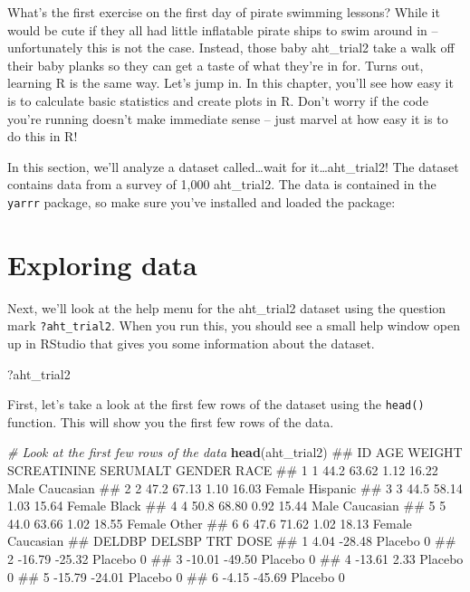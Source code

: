 \documentclass[12pt,]{krantz}
\makeatletter
\newenvironment{Shaded}{\begin{snugshade}}{\end{snugshade}}
\newcommand{\KeywordTok}[1]{\textcolor[rgb]{0.13,0.29,0.53}{\textbf{#1}}}
\newcommand{\CommentTok}[1]{\textcolor[rgb]{0.56,0.35,0.01}{\textit{#1}}}
\newcommand{\NormalTok}[1]{#1}
\newenvironment{kframe}{%
\medskip{}
\setlength{\fboxsep}{.8em}
 \def\at@end@of@kframe{}%
 \ifinner\ifhmode%
  \def\at@end@of@kframe{\end{minipage}}%
  \begin{minipage}{\columnwidth}%
 \fi\fi%
 \def\FrameCommand##1{\hskip\@totalleftmargin \hskip-\fboxsep
 \colorbox{shadecolor}{##1}\hskip-\fboxsep
     \hskip-\linewidth \hskip-\@totalleftmargin \hskip\columnwidth}%
 \MakeFramed {\advance\hsize-\width
   \@totalleftmargin\z@ \linewidth\hsize
   \@setminipage}}%
 {\par\unskip\endMakeFramed%
 \at@end@of@kframe}
\renewenvironment{Shaded}{\begin{kframe}}{\end{kframe}}
\theoremstyle{definition}
\theoremstyle{definition}
\theoremstyle{remark}
\makeatother
\begin{document}
What's the first exercise on the first day of pirate swimming lessons?
While it would be cute if they all had little inflatable pirate ships to
swim around in -- unfortunately this is not the case. Instead, those
baby aht\_trial2 take a walk off their baby planks so they can get a
taste of what they're in for. Turns out, learning R is the same way.
Let's jump in. In this chapter, you'll see how easy it is to calculate
basic statistics and create plots in R. Don't worry if the code you're
running doesn't make immediate sense -- just marvel at how easy it is to
do this in R!

In this section, we'll analyze a dataset called\ldots{}wait for
it\ldots{}aht\_trial2! The dataset contains data from a survey of 1,000
aht\_trial2. The data is contained in the \texttt{yarrr} package, so
make sure you've installed and loaded the package:

\section{Exploring data}\label{exploring-data}

Next, we'll look at the help menu for the aht\_trial2 dataset using the
question mark \texttt{?aht\_trial2}. When you run this, you should see a
small help window open up in RStudio that gives you some information
about the dataset.

\begin{Shaded}
\begin{Highlighting}[]
\NormalTok{?aht_trial2}
\end{Highlighting}
\end{Shaded}

First, let's take a look at the first few rows of the dataset using the
\texttt{head()} function. This will show you the first few rows of the
data.

\begin{Shaded}
\begin{Highlighting}[]
\CommentTok{# Look at the first few rows of the data}
\KeywordTok{head}\NormalTok{(aht_trial2)}
\NormalTok{##   ID  AGE WEIGHT SCREATININE SERUMALT GENDER      RACE}
\NormalTok{## 1  1 44.2  63.62        1.12    16.22   Male Caucasian}
\NormalTok{## 2  2 47.2  67.13        1.10    16.03 Female  Hispanic}
\NormalTok{## 3  3 44.5  58.14        1.03    15.64 Female     Black}
\NormalTok{## 4  4 50.8  68.80        0.92    15.44   Male Caucasian}
\NormalTok{## 5  5 44.0  63.66        1.02    18.55 Female     Other}
\NormalTok{## 6  6 47.6  71.62        1.02    18.13 Female Caucasian}
\NormalTok{##   DELDBP DELSBP     TRT DOSE}
\NormalTok{## 1   4.04 -28.48 Placebo    0}
\NormalTok{## 2 -16.79 -25.32 Placebo    0}
\NormalTok{## 3 -10.01 -49.50 Placebo    0}
\NormalTok{## 4 -13.61   2.33 Placebo    0}
\NormalTok{## 5 -15.79 -24.01 Placebo    0}
\NormalTok{## 6  -4.15 -45.69 Placebo    0}
\end{Highlighting}
\end{Shaded}
\end{document}

